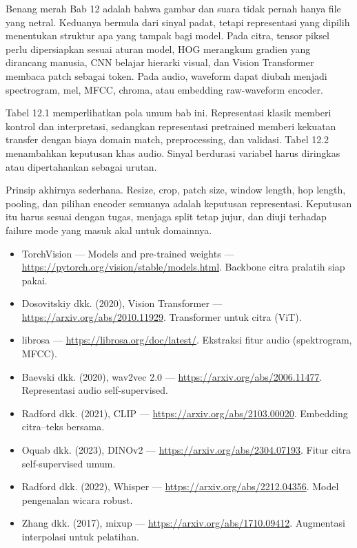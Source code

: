 \begin{sintesis}

Benang merah Bab 12 adalah bahwa gambar dan suara tidak pernah hanya file yang netral. Keduanya bermula dari sinyal padat, tetapi representasi yang dipilih menentukan struktur apa yang tampak bagi model. Pada citra, tensor piksel perlu dipersiapkan sesuai aturan model, HOG merangkum gradien yang dirancang manusia, CNN belajar hierarki visual, dan Vision Transformer membaca patch sebagai token. Pada audio, waveform dapat diubah menjadi spectrogram, mel, MFCC, chroma, atau embedding raw-waveform encoder.

Tabel 12.1 memperlihatkan pola umum bab ini. Representasi klasik memberi kontrol dan interpretasi, sedangkan representasi pretrained memberi kekuatan transfer dengan biaya domain match, preprocessing, dan validasi. Tabel 12.2 menambahkan keputusan khas audio. Sinyal berdurasi variabel harus diringkas atau dipertahankan sebagai urutan.

Prinsip akhirnya sederhana. Resize, crop, patch size, window length, hop length, pooling, dan pilihan encoder semuanya adalah keputusan representasi. Keputusan itu harus sesuai dengan tugas, menjaga split tetap jujur, dan diuji terhadap failure mode yang masuk akal untuk domainnya.

\end{sintesis}

\begin{bacaan}

\begin{itemize}
\tightlist
\item
  TorchVision --- Models and pre-trained weights --- \url{https://pytorch.org/vision/stable/models.html}. Backbone citra pralatih siap pakai.
\item
  Dosovitskiy dkk. (2020), Vision Transformer --- \url{https://arxiv.org/abs/2010.11929}. Transformer untuk citra (ViT).
\item
  librosa --- \url{https://librosa.org/doc/latest/}. Ekstraksi fitur audio (spektrogram, MFCC).
\item
  Baevski dkk. (2020), wav2vec 2.0 --- \url{https://arxiv.org/abs/2006.11477}. Representasi audio self-supervised.
\item
  Radford dkk. (2021), CLIP --- \url{https://arxiv.org/abs/2103.00020}. Embedding citra--teks bersama.
\item
  Oquab dkk. (2023), DINOv2 --- \url{https://arxiv.org/abs/2304.07193}. Fitur citra self-supervised umum.
\item
  Radford dkk. (2022), Whisper --- \url{https://arxiv.org/abs/2212.04356}. Model pengenalan wicara robust.
\item
  Zhang dkk. (2017), mixup --- \url{https://arxiv.org/abs/1710.09412}. Augmentasi interpolasi untuk pelatihan.
\end{itemize}

\end{bacaan}

